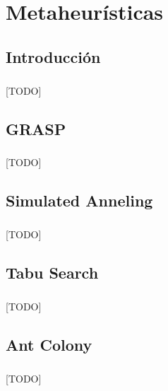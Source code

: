 \documentclass{subfiles}
\begin{document}
  \chapter{Metaheurísticas}
  \label{chap:metaheuristics}

    \section{Introducción}
    \label{sec:metaheuristics_introduction}

      \paragraph{}
      [TODO]

    \section{GRASP}
    \label{sec:metaheuristics_grasp}

      \paragraph{}
      [TODO]

    \section{Simulated Anneling}
    \label{sec:metaheuristics_simulated_anneling}

      \paragraph{}
      [TODO]

    \section{Tabu Search}
    \label{sec:metaheuristics_tabu}

      \paragraph{}
      [TODO]

    \section{Ant Colony}
    \label{sec:metaheuristics_ant_colony}

      \paragraph{}
      [TODO]
\end{document}
